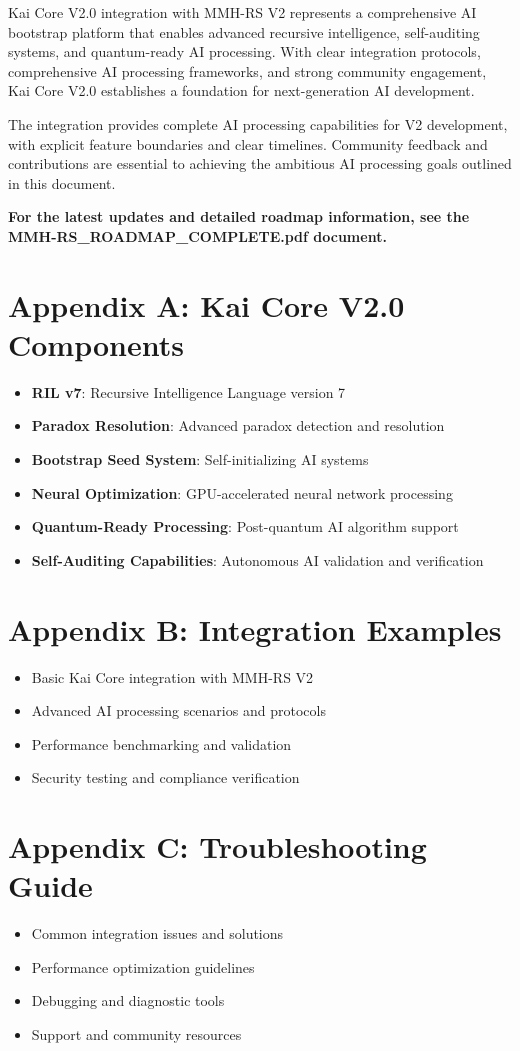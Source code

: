 \documentclass[12pt,a4paper]{article}
\begin{document}
Kai Core V2.0 integration with MMH-RS V2 represents a comprehensive AI bootstrap platform that enables advanced recursive intelligence, self-auditing systems, and quantum-ready AI processing. With clear integration protocols, comprehensive AI processing frameworks, and strong community engagement, Kai Core V2.0 establishes a foundation for next-generation AI development.

The integration provides complete AI processing capabilities for V2 development, with explicit feature boundaries and clear timelines. Community feedback and contributions are essential to achieving the ambitious AI processing goals outlined in this document.

\textbf{For the latest updates and detailed roadmap information, see the MMH-RS\_ROADMAP\_COMPLETE.pdf document.}

\appendix

\section{Appendix A: Kai Core V2.0 Components}
\begin{itemize}
    \item \textbf{RIL v7}: Recursive Intelligence Language version 7
    \item \textbf{Paradox Resolution}: Advanced paradox detection and resolution
    \item \textbf{Bootstrap Seed System}: Self-initializing AI systems
    \item \textbf{Neural Optimization}: GPU-accelerated neural network processing
    \item \textbf{Quantum-Ready Processing}: Post-quantum AI algorithm support
    \item \textbf{Self-Auditing Capabilities}: Autonomous AI validation and verification
\end{itemize}

\section{Appendix B: Integration Examples}
\begin{itemize}
    \item Basic Kai Core integration with MMH-RS V2
    \item Advanced AI processing scenarios and protocols
    \item Performance benchmarking and validation
    \item Security testing and compliance verification
\end{itemize}

\section{Appendix C: Troubleshooting Guide}
\begin{itemize}
    \item Common integration issues and solutions
    \item Performance optimization guidelines
    \item Debugging and diagnostic tools
    \item Support and community resources
\end{itemize}
\end{document}
